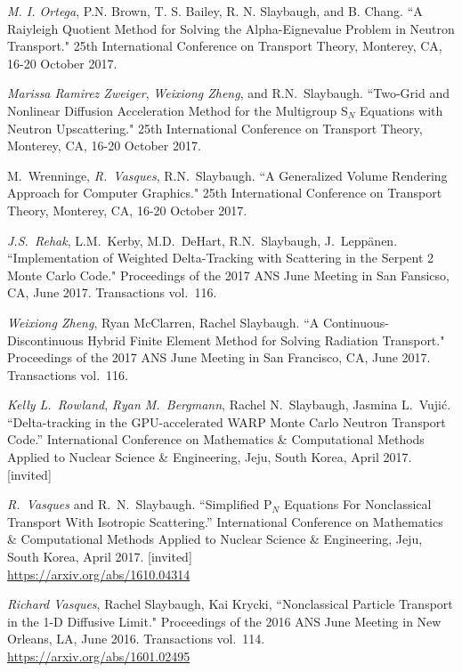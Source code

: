 \begin{bibsection}
\item \textit{M. I. Ortega}, P.N. Brown, T. S. Bailey, R. N. Slaybaugh, and B. Chang. ``A Raiyleigh Quotient Method for Solving the Alpha-Eignevalue Problem in Neutron Transport." 25th International Conference on Transport Theory, Monterey, CA, 16-20 October 2017.

\item  \textit{Marissa Ramirez Zweiger}, \textit{Weixiong Zheng}, and R.N.\ Slaybaugh. ``Two-Grid and Nonlinear Diffusion Acceleration Method for the Multigroup S$_N$ Equations with Neutron Upscattering." 25th International Conference on Transport Theory, Monterey, CA, 16-20 October 2017.

\item M.\ Wrenninge, \textit{R.\ Vasques}, R.N.\ Slaybaugh. ``A Generalized Volume Rendering Approach for Computer Graphics." 25th International Conference on Transport Theory, Monterey, CA, 16-20 October 2017.

\item \textit{J.S.\ Rehak}, L.M.\ Kerby, M.D.\ DeHart, R.N.\ Slaybaugh, J.\ Lepp\"{a}nen. ``Implementation of Weighted Delta-Tracking with Scattering in the Serpent 2 Monte Carlo Code." Proceedings of the 2017 ANS June Meeting in San Fansicso, CA, June 2017. Transactions vol.\ 116.

\item\textit{ Weixiong Zheng}, Ryan McClarren, Rachel Slaybaugh. ``A Continuous-Discontinuous Hybrid Finite Element Method for Solving Radiation Transport." Proceedings of the 2017 ANS June Meeting in San Francisco, CA, June 2017. Transactions vol.\ 116.

\item \textit{Kelly L.\ Rowland}, \textit{Ryan M.\ Bergmann}, Rachel N.\ Slaybaugh, Jasmina L.\ Vuji\'c. ``Delta-tracking in the GPU-accelerated WARP Monte Carlo Neutron Transport Code.'' International Conference on Mathematics \& Computational Methods Applied to Nuclear Science \& Engineering, Jeju, South Korea, April 2017. [invited]

\item \textit{R.\ Vasques} and R.\ N.\ Slaybaugh. ``Simplified P$_N$ Equations For Nonclassical Transport With Isotropic Scattering.'' International Conference on Mathematics \& Computational Methods Applied to Nuclear Science \& Engineering, Jeju, South Korea, April 2017. [invited]\\
\url{https://arxiv.org/abs/1610.04314}

\item \textit{Richard Vasques}, Rachel Slaybaugh, Kai Krycki, ``Nonclassical Particle Transport in the 1-D Diffusive Limit." Proceedings of the 2016 ANS June Meeting in New Orleans, LA, June 2016. Transactions vol.\ 114.\\
\url{https://arxiv.org/abs/1601.02495}


\end{bibsection}
